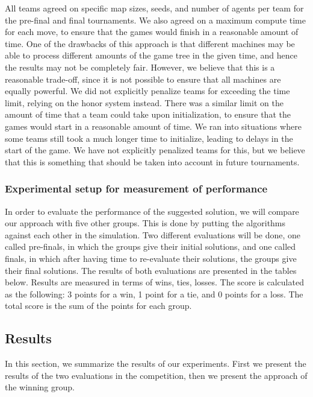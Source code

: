 \documentclass[a4paper,12pt]{article}
\begin{document}
All teams agreed on specific map sizes, seeds, and number of agents per team for the pre-final and final tournaments. We also agreed on a maximum compute time for each move, to ensure that the games would finish in a reasonable amount of time. One of the drawbacks of this approach is that different machines may be able to process different amounts of the game tree in the given time, and hence the results may not be completely fair. However, we believe that this is a reasonable trade-off, since it is not possible to ensure that all machines are equally powerful. We did not explicitly penalize teams for exceeding the time limit, relying on the honor system instead. There was a similar limit on the amount of time that a team could take upon initialization, to ensure that the games would start in a reasonable amount of time. We ran into situations where some teams still took a much longer time to initialize, leading to delays in the start of the game. We have not explicitly penalized teams for this, but we believe that this is something that should be taken into account in future tournaments.

\subsubsection{Experimental setup for measurement of performance}
In order to evaluate the performance of the suggested solution, we will compare our approach with five other groups. 
This is done by putting the algorithms against each other in the simulation. 
Two different evaluations will be done, one called pre-finals, in which the groups give their initial solutions, and one called finals, in which after having time to re-evaluate their solutions, the groups give their final solutions.
The results of both evaluations are presented in the tables below.
Results are measured in terms of wins, ties, losses. The score is calculated as the following: 3 points for a win, 1 point for a tie, and 0 points for a loss. The total score is the sum of the points for each group.




\subsection{Results}
\label{subsec:results}
In this section, we summarize the results of our experiments. First we present the results of the two evaluations in the competition, then we present the approach of the winning group.
\end{document}
